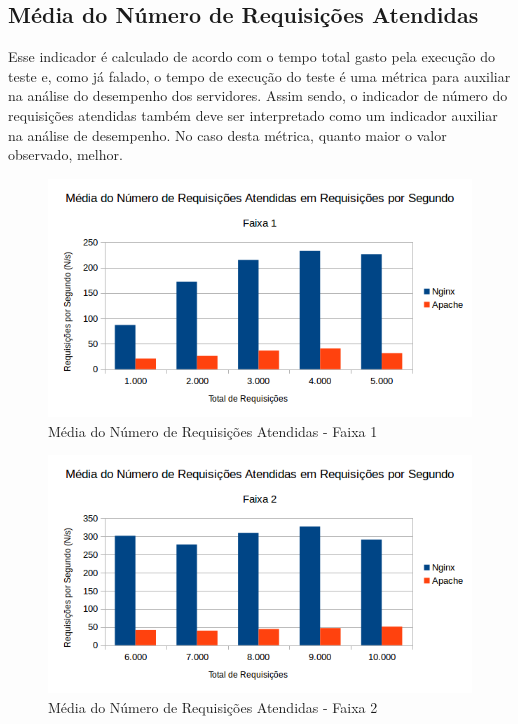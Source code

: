 \subsection{Média do Número de Requisições Atendidas}
Esse indicador é calculado de acordo com o tempo total gasto pela execução do 
teste e, como já falado, o tempo de execução do teste é uma métrica para 
auxiliar na análise do desempenho dos servidores. Assim sendo, o indicador de 
número do requisições atendidas também deve ser interpretado como um indicador 
auxiliar na análise de desempenho. No caso desta métrica, quanto maior o valor 
observado, melhor.
\begin{figure}[H]
	\centering
	\includegraphics[width=1\linewidth]{graficos/grafico4-f1} 
	\caption{Média do Número de Requisições Atendidas - Faixa 1}
	\label{fig:grafico4-f1}
\end{figure}
\begin{figure}[H]
	\centering
	\includegraphics[width=1\linewidth]{graficos/grafico4-f2} 
	\caption{Média do Número de Requisições Atendidas - Faixa 2}
	\label{fig:grafico4-f2}
\end{figure}
